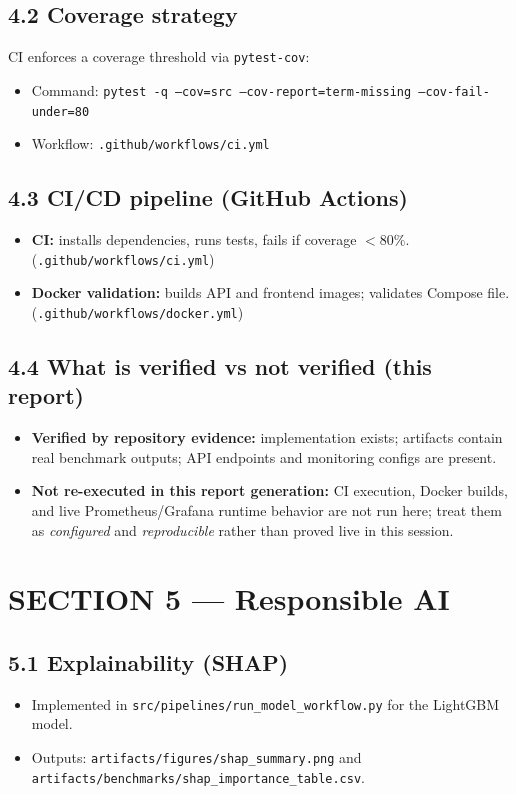 \documentclass[11pt]{article}
\newcommand{\code}[1]{\texttt{#1}}
\begin{document}
\subsection*{4.2 Coverage strategy}
CI enforces a coverage threshold via \code{pytest-cov}:
\begin{itemize}
  \item Command: \code{pytest -q --cov=src --cov-report=term-missing --cov-fail-under=80}
  \item Workflow: \code{.github/workflows/ci.yml}
\end{itemize}

\subsection*{4.3 CI/CD pipeline (GitHub Actions)}
\begin{itemize}
  \item \textbf{CI:} installs dependencies, runs tests, fails if coverage \(< 80\%\). (\code{.github/workflows/ci.yml})
  \item \textbf{Docker validation:} builds API and frontend images; validates Compose file. (\code{.github/workflows/docker.yml})
\end{itemize}

\subsection*{4.4 What is verified vs not verified (this report)}
\begin{itemize}
  \item \textbf{Verified by repository evidence:} implementation exists; artifacts contain real benchmark outputs; API endpoints and monitoring configs are present.
  \item \textbf{Not re-executed in this report generation:} CI execution, Docker builds, and live Prometheus/Grafana runtime behavior are not run here; treat them as \emph{configured} and \emph{reproducible} rather than proved live in this session.
\end{itemize}

\section*{SECTION 5 — Responsible AI}

\subsection*{5.1 Explainability (SHAP)}
\begin{itemize}
  \item Implemented in \code{src/pipelines/run\_model\_workflow.py} for the LightGBM model.
  \item Outputs:
    \code{artifacts/figures/shap\_summary.png} and \code{artifacts/benchmarks/shap\_importance\_table.csv}.
\end{itemize}
\end{document}
